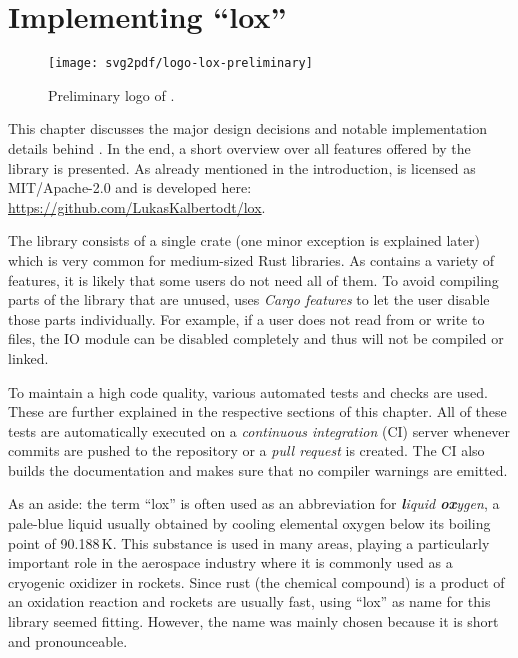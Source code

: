 \chapter{Implementing \enquote{lox}}
\label{chap:implementing-lox}

\vspace{-8mm}
\begin{figure}[h]
  \centering
  \texttt{[image: svg2pdf/logo-lox-preliminary]}
  \caption{Preliminary logo of .}
\end{figure}
\vspace{8mm}

This chapter discusses the major design decisions and notable implementation details behind .
In the end, a short overview over all features offered by the library is presented.
As already mentioned in the introduction,  is licensed as MIT/Apache-2.0 and is developed here: \url{https://github.com/LukasKalbertodt/lox}.

The library consists of a single crate (one minor exception is explained later) which is very common for medium-sized Rust libraries.
As  contains a variety of features, it is likely that some users do not need all of them.
To avoid compiling parts of the library that are unused,  uses \emph{Cargo features} to let the user disable those parts individually.
For example, if a user does not read from or write to files, the IO module can be disabled completely and thus will not be compiled or linked.

To maintain a high code quality, various automated tests and checks are used.
These are further explained in the respective sections of this chapter.
All of these tests are automatically executed on a \emph{continuous integration} (CI) server whenever commits are pushed to the repository or a \emph{pull request} is created.
The CI also builds the documentation and makes sure that no compiler warnings are emitted.


\vfill
\begin{center}
  \begin{minipage}{.9\textwidth}
    \small
    As an aside:
    the term \enquote{lox} is often used as an abbreviation for \emph{\textbf{l}iquid \textbf{ox}ygen}, a pale-blue liquid usually obtained by cooling elemental oxygen below its boiling point of 90.188\,K.
    This substance is used in many areas, playing a particularly important role in the aerospace industry where it is commonly used as a cryogenic oxidizer in rockets.
    Since rust (the chemical compound\footnotemark) is a product of an oxidation reaction and rockets are usually fast, using \enquote{lox} as name for this library seemed fitting.
    However, the name was mainly chosen because it is short and pronounceable.
  \end{minipage}
\end{center}


\newpage


\newpage


\newpage


\newpage


\newpage

